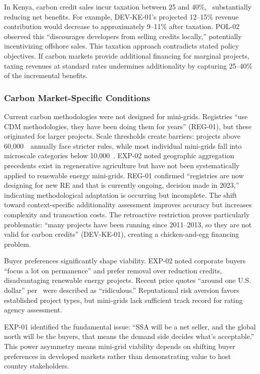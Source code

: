 In Kenya, carbon credit sales incur taxation between 25 and 40\%,~\cite{kenya-climate-change-regulations} substantially reducing net benefits. For example, DEV-KE-01's projected 12--15\% revenue contribution would decrease to approximately 9--11\% after taxation. POL-02 observed this ``discourages developers from selling credits locally,'' potentially incentivizing offshore sales. This taxation approach contradicts stated policy objectives. If carbon markets provide additional financing for marginal projects, taxing revenues at standard rates undermines additionality by capturing 25--40\% of the incremental benefits.

\subsubsection{Carbon Market-Specific Conditions}
Current carbon methodologies were not designed for mini-grids. Registries ``use CDM methodologies, they have been doing them for years'' (REG-01), but these originated for larger projects. Scale thresholds create barriers: projects above 60,000~\tcooe\ annually face stricter rules, while most individual mini-grids fall into microscale categories below 10,000~\tcooe. EXP-02 noted geographic aggregation precedents exist in regenerative agriculture but have not been systematically applied to renewable energy mini-grids. REG-01 confirmed ``registries are now designing for new RE and that is currently ongoing, decision made in 2023,'' indicating methodological adaptation is occurring but incomplete. The shift toward context-specific additionality assessment improves accuracy but increases complexity and transaction costs. The retroactive restriction proves particularly problematic: ``many projects have been running since 2011--2013, so they are not valid for carbon credits'' (DEV-KE-01), creating a chicken-and-egg financing problem.

Buyer preferences significantly shape viability. EXP-02 noted corporate buyers ``focus a lot on permanence'' and prefer removal over reduction credits, disadvantaging renewable energy projects. Recent price quotes ``around one U.S. dollar'' per \tcooe\ were described as ``ridiculous.'' Reputational risk aversion favors established project types, but mini-grids lack sufficient track record for rating agency assessment.

EXP-01 identified the fundamental issue: ``SSA will be a net seller, and the global north will be the buyers, that means the demand side decides what's acceptable.'' This power asymmetry means mini-grid viability depends on shifting buyer preferences in developed markets rather than demonstrating value to host country stakeholders.

